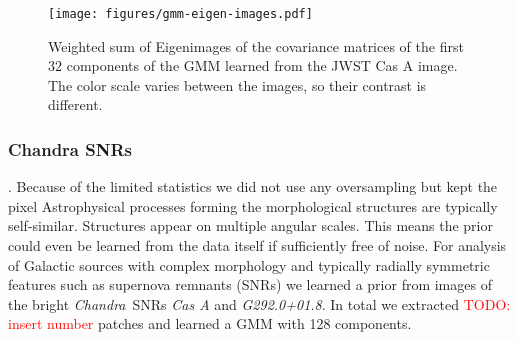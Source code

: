 \documentclass[twocolumn]{aastex631}
\newcommand{\chandra}{\textit{Chandra}~}
\newcommand{\todo}[1]{\textcolor{red}{TODO: #1}\PackageWarning{TODO:}{#1!}}
\begin{document}


    \begin{figure}
        \begin{centering}
            \texttt{[image: figures/gmm-eigen-images.pdf]}
            \caption{
                Weighted sum of Eigenimages of the covariance matrices of the first $32$ components of the GMM learned from the JWST Cas A image. The color scale varies between the images, so their contrast is different. 
            }
            \label{fig:gmm-eigen-images}
        \end{centering}
    \end{figure}

    \subsubsection{Chandra SNRs}
    \label{sssec:chandra-snrs}. Because of the limited statistics we did not use any oversampling but kept the pixel Astrophysical processes forming the morphological structures are typically self-similar. Structures appear on multiple angular scales. This means the prior could even be learned from the data itself if sufficiently free of noise. For analysis of Galactic sources with complex morphology and typically radially symmetric features such as supernova remnants (SNRs) we learned a prior from images of the bright \chandra SNRs \textit{Cas A} and \textit{G292.0+01.8}. In total we extracted \todo{insert number} patches and learned a GMM with 128 components.
\end{document}
